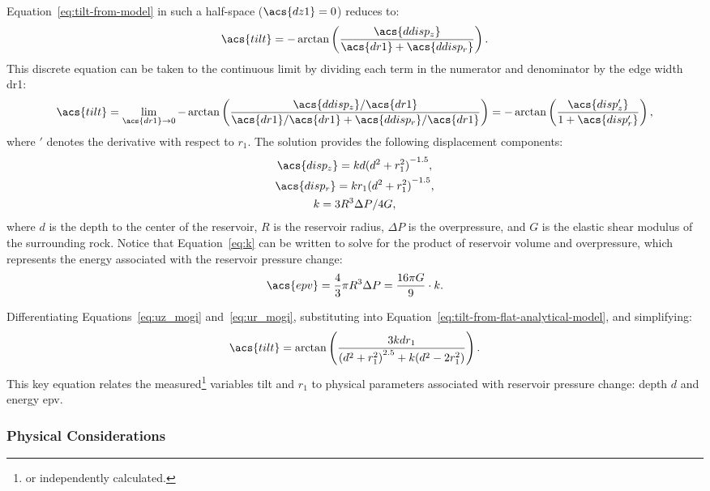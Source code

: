 Equation~\eqref{eq:tilt-from-model} in such a half-space ($\acs{dz1} = 0$) reduces to:
\begin{equation}
    \acs{tilt} = 
    -\arctan\left(\dfrac{\acs{ddisp_z}}{\acs{dr1}+\acs{ddisp_r}}\right).\label{eq:tilt-from-flat-model}
\end{equation}
This discrete equation can be taken to the continuous limit by dividing each term in the numerator and denominator by the edge width \acs{dr1}:
\begin{equation}
\acs{tilt}
    = \lim_{\acs{dr1}\to0} 
    -\arctan\left(\dfrac{\acs{ddisp_z}/\acs{dr1}}{\acs{dr1}/\acs{dr1}
    + \acs{ddisp_r}/\acs{dr1}}\right) = 
    -\arctan\left(\dfrac{\acs{disp_z'}}{1+\acs{disp_r'}}\right),\label{eq:tilt-from-flat-analytical-model}
\end{equation}
where $'$ denotes the derivative with respect to $r_1$. The \textcite{mogi_relations_1958} solution provides the following displacement components:
\begin{gather}
    \acs{disp_z} = kd{(d^2+r_1^2)}^{-1.5},\label{eq:uz_mogi}\\
    \acs{disp_r} = kr_1{(d^2+r_1^2)}^{-1.5},\label{eq:ur_mogi}\\
    k = {3R^3\Delta P}/{4G},\label{eq:k}
\end{gather}
where $d$ is the depth to the center of the reservoir, $R$ is the reservoir radius, $\Delta P$ is the overpressure, and $G$ is the elastic shear modulus of the surrounding rock. Notice that Equation~\eqref{eq:k} can be written to solve for the product of reservoir volume and overpressure, which represents the energy associated with the reservoir pressure change:
\begin{equation}
    \acs{epv} = \frac{4}{3}\pi R^3\Delta P=\frac{16\pi G}{9} \cdot k.\label{eq:epv}
\end{equation}

Differentiating Equations~\eqref{eq:uz_mogi} and~\eqref{eq:ur_mogi}, substituting into Equation~\eqref{eq:tilt-from-flat-analytical-model}, and simplifying:
\begin{equation}
    \acs{tilt} = \arctan\left(\frac{3kdr_1}{{(d^2+r_1^2)}^{2.5}+k(d^2-2r_1^2)}\right).\label{eq:tilt-from-mogi-model}
\end{equation}
This key equation relates the measured\footnote{or independently calculated.} variables \acs{tilt} and $r_1$ to physical parameters associated with reservoir pressure change: depth $d$ and energy \acs{epv}.

\subsubsection{Physical Considerations}

